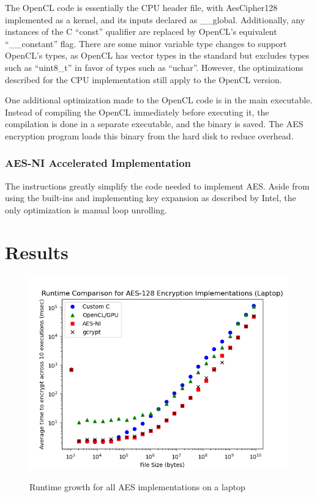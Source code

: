 \documentclass[a4paper,10pt]{article}
\begin{document}
The OpenCL code is essentially the CPU header file, with AesCipher128 implemented as a kernel, and its inputs declared as \_\_global.  Additionally, any instances of the C ``const'' qualifier are replaced by OpenCL's equivalent ``\_\_constant'' flag.  There are some minor variable type changes to support OpenCL's types, as OpenCL has vector types in the standard but excludes types such as ``uint8\_t'' in favor of types such as ``uchar''.  However, the optimizations described for the CPU implementation still apply to the OpenCL version.

One additional optimization made to the OpenCL code is in the main executable.  Instead of compiling the OpenCL immediately before executing it, the compilation is done in a separate executable, and the binary is saved.  The AES encryption program loads this binary from the hard disk to reduce overhead.

\subsubsection{AES-NI Accelerated Implementation}

The instructions greatly simplify the code needed to implement AES.  Aside from using the built-ins and implementing key expansion as described by Intel, the only optimization is manual loop unrolling.

\section{Results}

\begin{figure}[H]
 \begin{center}
  \includegraphics[width=\textwidth]{results_laptop.png}
  \label{plot_laptop}
  \caption{Runtime growth for all AES implementations on a laptop}
 \end{center}
\end{figure}
\end{document}
